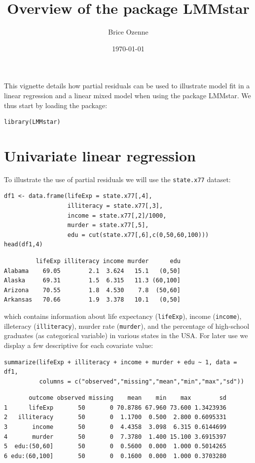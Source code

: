 \documentclass[12pt]{article}
\author{Brice Ozenne}
\date{\today}
\title{Overview of the package LMMstar}
\begin{document}
\maketitle
This vignette details how partial residuals can be used to illustrate
model fit in a linear regression and a linear mixed model when using
the package LMMstar. We thus start by loading the package:
\lstset{language=r,label= ,caption= ,captionpos=b,numbers=none}
\begin{lstlisting}
library(LMMstar)
\end{lstlisting}


\section{Univariate linear regression}
\label{sec:org0a67e79}

To illustrate the use of partial residuals we will use the \texttt{state.x77}
dataset:
\lstset{language=r,label= ,caption= ,captionpos=b,numbers=none}
\begin{lstlisting}
df1 <- data.frame(lifeExp = state.x77[,4],
                  illiteracy = state.x77[,3],
                  income = state.x77[,2]/1000,
                  murder = state.x77[,5],
                  edu = cut(state.x77[,6],c(0,50,60,100)))
head(df1,4)
\end{lstlisting}

\begin{verbatim}
         lifeExp illiteracy income murder      edu
Alabama    69.05        2.1  3.624   15.1   (0,50]
Alaska     69.31        1.5  6.315   11.3 (60,100]
Arizona    70.55        1.8  4.530    7.8  (50,60]
Arkansas   70.66        1.9  3.378   10.1   (0,50]
\end{verbatim}


 which contains information about life expectancy (\texttt{lifeExp}), income
(\texttt{income}), illeteracy (\texttt{illiteracy}), murder rate (\texttt{murder}), and the
percentage of high-school graduates (as categorical variable) in
various states in the USA. For later use we display a few descriptive
for each covariate value:
\lstset{language=r,label= ,caption= ,captionpos=b,numbers=none}
\begin{lstlisting}
summarize(lifeExp + illiteracy + income + murder + edu ~ 1, data = df1,
          columns = c("observed","missing","mean","min","max","sd"))
\end{lstlisting}

\begin{verbatim}
       outcome observed missing    mean    min    max        sd
1      lifeExp       50       0 70.8786 67.960 73.600 1.3423936
2   illiteracy       50       0  1.1700  0.500  2.800 0.6095331
3       income       50       0  4.4358  3.098  6.315 0.6144699
4       murder       50       0  7.3780  1.400 15.100 3.6915397
5  edu:(50,60]       50       0  0.5600  0.000  1.000 0.5014265
6 edu:(60,100]       50       0  0.1600  0.000  1.000 0.3703280
\end{verbatim}
\end{document}
